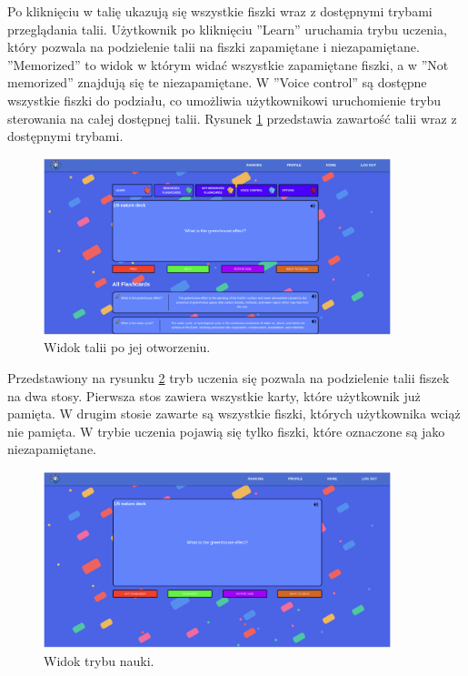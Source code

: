 Po kliknięciu w talię ukazują się wszystkie fiszki wraz z dostępnymi trybami przeglądania talii. Użytkownik po kliknięciu ”Learn” uruchamia trybu uczenia, który pozwala na podzielenie talii na fiszki zapamiętane i niezapamiętane. ”Memorized” to widok w którym widać wszystkie zapamiętane fiszki, a w ”Not memorized” znajdują się te niezapamiętane. W ”Voice control” są dostępne wszystkie fiszki do podziału, co umożliwia użytkownikowi uruchomienie trybu sterowania na całej dostępnej talii. Rysunek \ref{img:web_deck} przedstawia zawartość talii wraz z dostępnymi trybami.


\begin{figure}[H]
    \centering
    \includegraphics[width=0.9\textwidth]{chapters/chapter_10/images_web/web_deck}
    \caption{Widok talii po jej otworzeniu.}
    \label{img:web_deck}
\end{figure}

Przedstawiony na rysunku \ref{img:web_learn} tryb uczenia się pozwala na podzielenie talii fiszek na dwa stosy. Pierwsza stos zawiera wszystkie karty, które użytkownik już pamięta.
W drugim stosie zawarte są wszystkie fiszki, których użytkownika wciąż nie pamięta. W trybie uczenia pojawią się tylko fiszki, które oznaczone są jako niezapamiętane.


\begin{figure}[H]
    \centering
    \includegraphics[width=0.9\textwidth]{chapters/chapter_10/images_web/web_learn}
    \caption{Widok trybu nauki.}
    \label{img:web_learn}
\end{figure}

